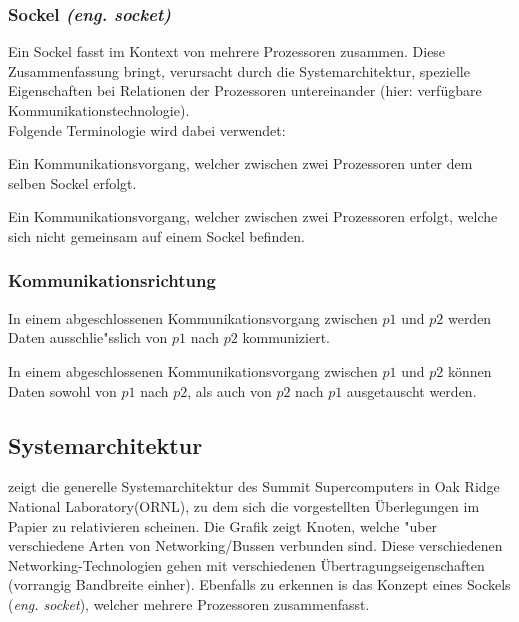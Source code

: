 \subsubsection{Sockel \textit{(eng. socket)}}
Ein Sockel fasst im Kontext von \cite{mainpaper} mehrere Prozessoren zusammen. Diese Zusammenfassung bringt, verursacht durch die Systemarchitektur, spezielle Eigenschaften bei Relationen der Prozessoren untereinander (hier: verfügbare Kommunikationstechnologie).\\
Folgende Terminologie wird dabei verwendet:
\begin{defi}
Ein Kommunikationsvorgang, welcher zwischen zwei Prozessoren unter dem selben Sockel erfolgt.
\end{defi}
\begin{defi}
Ein Kommunikationsvorgang, welcher zwischen zwei Prozessoren erfolgt, welche sich nicht gemeinsam auf einem Sockel befinden.
\end{defi}

\subsubsection{Kommunikationsrichtung}
\begin{defi}
In einem abgeschlossenen Kommunikationsvorgang zwischen $p1$ und $p2$ werden Daten ausschlie"sslich von $p1$ nach $p2$ kommuniziert.
\end{defi}
\begin{defi}
In einem abgeschlossenen Kommunikationsvorgang zwischen $p1$ und $p2$ können Daten sowohl von $p1$ nach $p2$, als auch von $p2$ nach $p1$ ausgetauscht werden.
\end{defi}


\subsection{Systemarchitektur}
\cite[Abb. 1]{mainpaper} zeigt die generelle Systemarchitektur des Summit Supercomputers in Oak Ridge National Laboratory(ORNL), zu dem sich die vorgestellten Überlegungen im Papier zu relativieren scheinen. Die Grafik zeigt Knoten, welche "uber verschiedene Arten von Networking/Bussen verbunden sind. Diese verschiedenen Networking-Technologien gehen mit verschiedenen Übertragungseigenschaften (vorrangig Bandbreite einher). Ebenfalls zu erkennen is das Konzept eines Sockels (\textit{eng. socket}), welcher mehrere Prozessoren zusammenfasst. 

